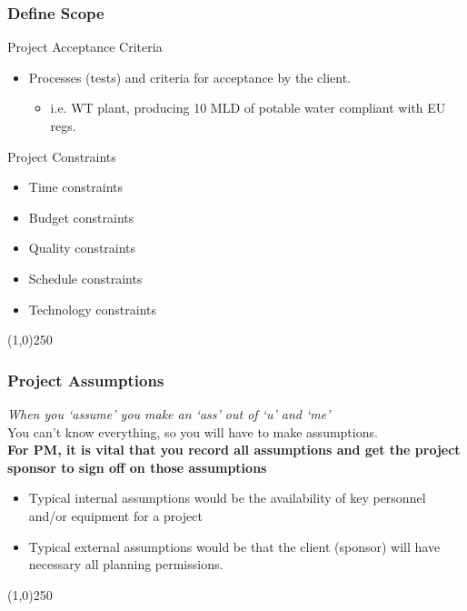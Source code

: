 \begin{frame}
\frametitle{Define Scope}
Project Acceptance Criteria
\begin{itemize}
	\item Processes (tests) and criteria for acceptance by the client.
		\begin{itemize}
			\item i.e. WT plant, producing 10 MLD of potable water compliant with EU regs.
		\end{itemize}
\end{itemize}
Project Constraints
\begin{itemize}
	\item Time constraints
	\item Budget constraints
	\item Quality constraints
	\item Schedule constraints
	\item Technology constraints
\end{itemize}
\end{frame}\begin{center}\line(1,0){250}\end{center}



\begin{frame}
\frametitle{Project Assumptions}
\emph{When you `assume' you make an `ass' out of `u' and `me'}\smiley{}\\
You can't know everything, so you will have to make assumptions.\\
\textbf{For PM, it is vital that you record all assumptions and get the project sponsor to sign off on those assumptions}\\
\begin{itemize}
	\item Typical internal assumptions would be the availability of key personnel and/or equipment for a project
	\item Typical external assumptions would be that the client (sponsor) will have necessary all planning permissions.
\end{itemize}
\end{frame}\begin{center}\line(1,0){250}\end{center}



